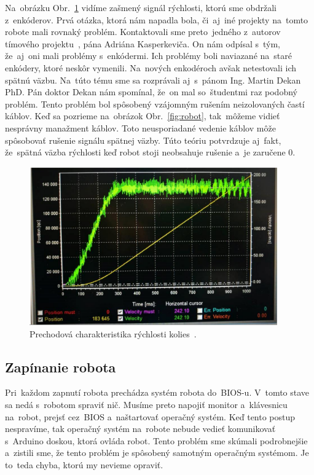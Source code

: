 Na~obrázku Obr.~\ref{fig:prechChar} vidíme zašmený signál rýchlosti, ktorú sme obdržali z~enkóderov. Prvá
otázka, ktorá nám napadla bola, či~aj~iné projekty na~tomto robote mali rovnaký problém. Kontaktovali
sme preto~jedného z~autorov tímového projektu~\cite{timovyProjekt}, pána Adriána Kasperkeviča. On nám odpísal s~tým,
že~aj~oni mali problémy s~enkódermi. Ich problémy boli naviazané na~staré enkódery, ktoré neskôr
vymenili. Na~nových enkodéroch avšak netestovali ich spätnú väzbu. Na~túto tému sme sa rozprávali
aj~s~pánom Ing. Martin Dekan PhD. Pán doktor Dekan nám spomínal, že~on mal so~študentmi raz podobný
problém. Tento problém bol spôsobený vzájomným rušením neizolovaných častí káblov. Keď sa pozrieme
na~obrázok Obr.~\ref{fig:robot}, tak~môžeme vidieť nesprávny manažment káblov. Toto neusporiadané vedenie káblov môže
spôsobovať rušenie signálu spätnej väzby. Túto teóriu potvrdzuje aj~fakt, že~spätná väzba rýchlosti
keď robot stoji neobsahuje rušenie a~je zaručene 0.

\begin{figure}[!htbp]
	\begin{center}
		\includegraphics[width=0.95\textwidth]{img/robotSpeedChar.png}
	\end{center}
	\caption{Prechodová charakteristika rýchlosti kolies~\cite{timovyProjekt}. }
	\label{fig:prechChar}
\end{figure}

\subsection{Zapínanie robota}
\label{subsec:zapinanieRobota}

Pri~každom zapnutí robota prechádza systém robota do~BIOS-u. V~tomto stave sa nedá s~robotom spraviť nič. Musíme preto
napojiť monitor a~klávesnicu na~robot, prejsť cez~BIOS a~naštartovať operačný systém. Keď tento postup nespravíme, tak
operačný systém na~robote nebude vedieť komunikovať s~Arduino doskou, ktorá ovláda robot. Tento problém sme skúmali
podrobnejšie a~zistili sme, že tento problém je spôsobený samotným operačným systémom. Je to~teda chyba, ktorú my
nevieme opraviť.

\clearpage
